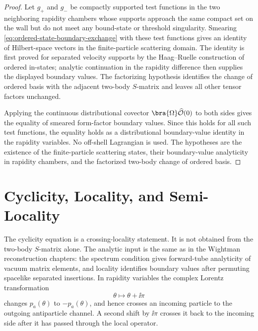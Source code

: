 \begin{proof}
Let \(g_+\) and \(g_-\) be compactly supported test functions in the two
neighboring rapidity chambers whose supports approach the same compact set on
the wall but do not meet any bound-state or threshold singularity.  Smearing
\eqref{eq:ordered-state-boundary-exchange} with these test functions gives an
identity of Hilbert-space vectors in the finite-particle scattering domain.
The identity is first proved for separated velocity supports by the
Haag--Ruelle construction of ordered in-states; analytic continuation in the
rapidity difference then supplies the displayed boundary values.  The
factorizing hypothesis identifies the change of ordered basis with the
adjacent two-body \(S\)-matrix and leaves all other tensor factors unchanged.

Applying the continuous distributional covector
\(\bra{\Omega}\widehat{\mathcal O}(0)\) to both sides gives the equality of
smeared form-factor boundary values.  Since this holds for all such test
functions, the equality holds as a distributional boundary-value identity in
the rapidity variables.  No off-shell Lagrangian is used.  The hypotheses are
the existence of the finite-particle scattering states, their
boundary-value analyticity in rapidity chambers, and the factorized
two-body change of ordered basis.
\end{proof}

\section{Cyclicity, Locality, and Semi-Locality}

The cyclicity equation is a crossing-locality statement.  It is not obtained
from the two-body \(S\)-matrix alone.  The analytic input is the same as in
the Wightman reconstruction chapters: the spectrum condition gives
forward-tube analyticity of vacuum matrix elements, and locality identifies
boundary values after permuting spacelike separated insertions.  In rapidity
variables the complex Lorentz transformation
\[
  \theta\longmapsto\theta+\ii\pi
\]
changes \(p_a(\theta)\) to \(-p_a(\theta)\), and hence crosses an incoming
particle to the outgoing antiparticle channel.  A second shift by \(\ii\pi\)
crosses it back to the incoming side after it has passed through the local
operator.


